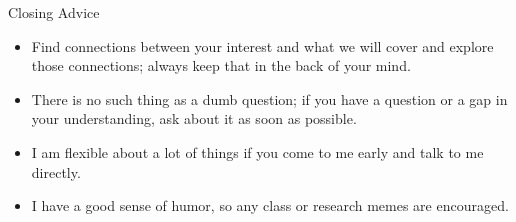 \documentclass[]{beamer}
\begin{document}
\begin{frame}{Closing Advice}
    \begin{itemize}
        \item Find connections between your interest and what we will cover and explore those connections; always keep that in the back of your mind.
        \item There is no such thing as a dumb question; if you have a question or a gap in your understanding, ask about it as soon as possible.
        \item I am flexible about a lot of things if you come to me early and talk to me directly.
        \item I have a good sense of humor, so any class or research memes are encouraged.
        
    \end{itemize}
\end{frame}
\end{document}

